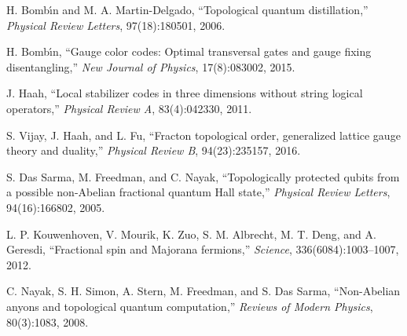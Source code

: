 \documentclass[12pt]{article}
\begin{document}
\begin{thebibliography}{99}
H. Bomb\'{\i}n and M. A. Martin-Delgado,
\newblock ``Topological quantum distillation,''
\newblock \emph{Physical Review Letters}, 97(18):180501, 2006.

H. Bomb\'{\i}n,
\newblock ``Gauge color codes: Optimal transversal gates and gauge fixing disentangling,''
\newblock \emph{New Journal of Physics}, 17(8):083002, 2015.

J. Haah,
\newblock ``Local stabilizer codes in three dimensions without string logical operators,''
\newblock \emph{Physical Review A}, 83(4):042330, 2011.

S. Vijay, J. Haah, and L. Fu,
\newblock ``Fracton topological order, generalized lattice gauge theory and duality,''
\newblock \emph{Physical Review B}, 94(23):235157, 2016.

S. Das Sarma, M. Freedman, and C. Nayak,
\newblock ``Topologically protected qubits from a possible non-Abelian fractional quantum Hall state,''
\newblock \emph{Physical Review Letters}, 94(16):166802, 2005.

L. P. Kouwenhoven, V. Mourik, K. Zuo, S. M. Albrecht, M. T. Deng, and A. Geresdi,
\newblock ``Fractional spin and Majorana fermions,''
\newblock \emph{Science}, 336(6084):1003--1007, 2012.

C. Nayak, S. H. Simon, A. Stern, M. Freedman, and S. Das Sarma,
\newblock ``Non-Abelian anyons and topological quantum computation,''
\newblock \emph{Reviews of Modern Physics}, 80(3):1083, 2008.

\end{thebibliography}
\end{document}
